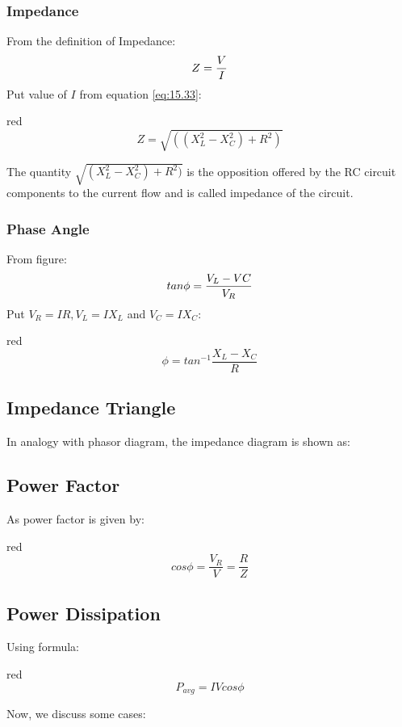 \subsubsection*{Impedance}
From the definition of Impedance:
\begin{equation}\notag
    Z = \frac{V}{I}
\end{equation}
Put value of $I$ from equation \ref{eq:15.33}:
\begin{mybox}{red}{}
    \begin{equation}\label{eq:15.35}
        Z = \sqrt{ ((X_{L}^{2}-X_{C}^{2}) + R^{2})}
    \end{equation} 
\end{mybox}
\noindent The quantity $\sqrt{ (X_{L}^{2}-X_{C}^{2}) + R^{2})}$ is the
opposition offered by the RC circuit components to the current flow
and is called impedance of the circuit.
\subsubsection{Phase Angle}
From figure:
\begin{equation}\notag
    tan \phi =\frac{V_{L}-V{C}}{V_{R}}
\end{equation}
Put $V_{R}=IR, V_{L}=IX_{L}$ and $V_{C}=IX_{C}$:
\begin{mybox}{red}{}
\begin{equation}\label{eq:15.36}
    \phi =tan^{-1}\frac{X_{L}-X_{C}}{R}
\end{equation}
\end{mybox}
\subsection*{Impedance Triangle}
In analogy with phasor diagram, the impedance diagram is shown as:
\subsection*{Power Factor}
As power factor is given by:
\begin{mybox}{red}{}
\begin{equation}\label{eq:15.37}
    cos \phi = \frac{V_{R}}{V} = \frac{R}{Z}
\end{equation}
\end{mybox}
\subsection*{Power Dissipation}
Using formula:
\begin{mybox}{red}{}
\begin{equation}\label{eq:15.38}
    P_{avg} =I V cos \phi
\end{equation}
\end{mybox}
\noindent Now, we discuss some cases:
